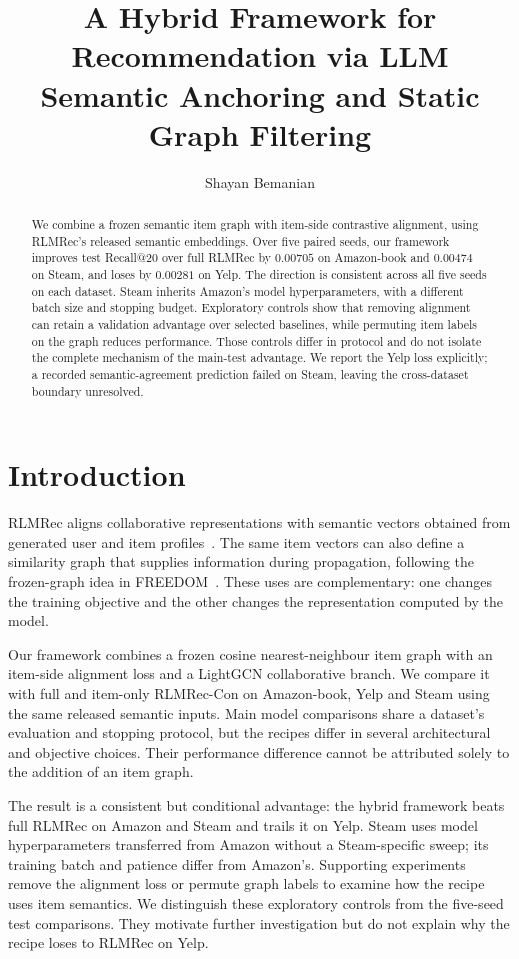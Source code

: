 \documentclass[runningheads]{llncs}
\title{A Hybrid Framework for Recommendation via LLM Semantic Anchoring and Static Graph Filtering}
\author{Shayan Bemanian}
\institute{}
\begin{document}
\maketitle

\begin{abstract}
We combine a frozen semantic item graph with item-side contrastive alignment,
using RLMRec's released semantic embeddings.
Over five paired seeds, our framework improves test Recall@20 over full RLMRec
by $0.00705$ on Amazon-book and $0.00474$ on Steam, and loses by $0.00281$
on Yelp. The direction is consistent across all five seeds on each dataset.
Steam inherits Amazon's model hyperparameters, with a different batch size and
stopping budget. Exploratory controls show that removing alignment can retain
a validation advantage over selected baselines, while permuting item labels
on the graph reduces performance. Those controls differ in protocol and do
not isolate the complete mechanism of the main-test advantage. We report the
Yelp loss explicitly; a recorded semantic-agreement prediction failed on
Steam, leaving the cross-dataset boundary unresolved.
\end{abstract}

\section{Introduction}
RLMRec aligns collaborative representations with semantic vectors obtained
from generated user and item profiles~\cite{rlmrec}. The same item vectors
can also define a similarity graph that supplies information during
propagation, following the frozen-graph idea in FREEDOM~\cite{freedom}.
These uses are complementary: one changes the training objective and the
other changes the representation computed by the model.

Our framework combines a frozen cosine nearest-neighbour item
graph with an item-side alignment loss and a LightGCN collaborative branch.
We compare it with full and item-only RLMRec-Con on Amazon-book, Yelp and
Steam using the same released semantic inputs. Main model comparisons share
a dataset's evaluation and stopping protocol, but the recipes differ in
several architectural and objective choices. Their performance difference
cannot be attributed solely to the addition of an item graph.

The result is a consistent but conditional advantage: the hybrid framework beats
full RLMRec on Amazon and Steam and trails it on Yelp. Steam uses model
hyperparameters transferred from Amazon without a Steam-specific sweep;
its training batch and patience differ from Amazon's. Supporting experiments
remove the alignment loss or permute graph labels to examine how the recipe
uses item semantics. We distinguish these exploratory controls from the
five-seed test comparisons. They motivate further investigation but do not
explain why the recipe loses to RLMRec on Yelp.
\end{document}
